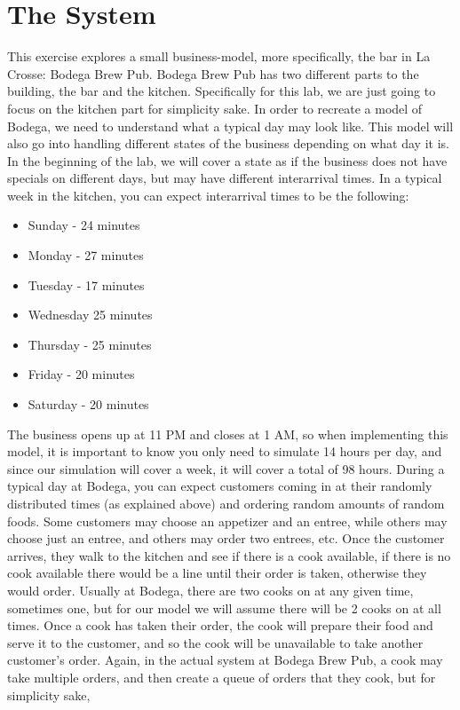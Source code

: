 \documentclass[11pt]{article}
\begin{document}
\section*{The System}
This exercise explores a small business-model, more specifically, the bar in La Crosse: Bodega Brew Pub.
Bodega Brew Pub has two different parts to the building, the bar and the kitchen. Specifically for this lab, we are just going to focus on the kitchen part for simplicity sake.
In order to recreate a model of Bodega, we need to understand what a typical day may look like. This model will also go into handling different states of the business depending on what day it is.
In the beginning of the lab, we will cover a state as if the business does not have specials on different days, but may have different interarrival times. In a typical week in the kitchen,
you can expect interarrival times to be the following:
\begin{itemize}[noitemsep]
	\item Sunday - 24 minutes
	\item Monday - 27 minutes
	\item Tuesday - 17 minutes
	\item Wednesday 25 minutes
	\item Thursday - 25 minutes
	\item Friday - 20 minutes
	\item Saturday - 20 minutes
\end{itemize}
The business opens up at 11 PM and closes at 1 AM, so when implementing this model, it is important to know you only need to simulate 14 hours per day, and since our simulation will cover a week, it will cover a total of 98 hours.
\newline
During a typical day at Bodega, you can expect customers coming in at their randomly distributed times (as explained above) and ordering random amounts of random foods. Some customers may choose an appetizer and an entree,
while others may choose just an entree, and others may order two entrees, etc. Once the customer arrives, they walk to the kitchen and see if there is a cook available, if there is no cook available there would be a line until their
order is taken, otherwise they would order. Usually at Bodega, there are two cooks on at any given time, sometimes one, but for our model we will assume there will be 2 cooks on at all times. Once a cook has taken their order, the cook will prepare their food and serve it to
the customer, and so the cook will be unavailable to take another customer's order. Again, in the actual system at Bodega Brew Pub, a cook may take multiple orders, and then create a queue of orders that they cook, but for simplicity sake,
\end{document}
